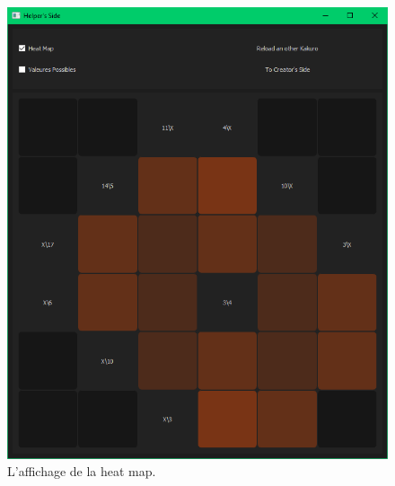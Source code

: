 \documentclass[french,12pt]{article}
\begin{document}
\begin{figure}[ht]
  \begin{center}
    \includegraphics[width=\textwidth]{./ressources/heatmap.png} 
  \end{center}
  \caption{L'affichage de la heat map.}
\end{figure}
\end{document}
